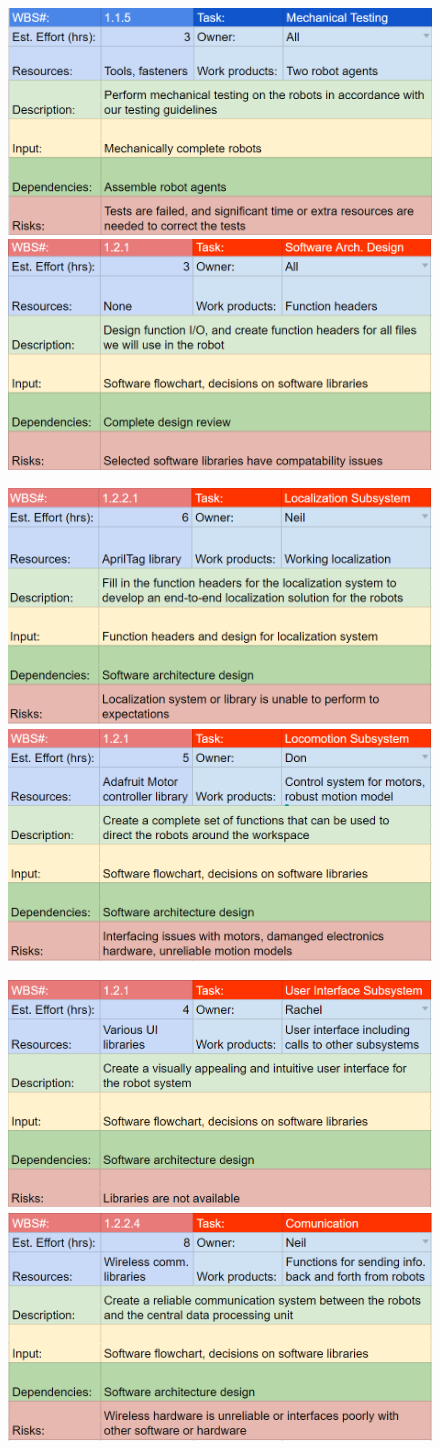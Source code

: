 \begin{figure}[h!]
\centering
\includegraphics[width=0.49\columnwidth]{wbs_schedule/wbs_dict_hw7.png}
\includegraphics[width=0.49\columnwidth]{wbs_schedule/wbs_dict_sw1.png}
\label{fig:hw7sw1}
\end{figure}
\begin{figure}[h!]
\centering
\includegraphics[width=0.49\columnwidth]{wbs_schedule/wbs_dict_sw2.png}
\includegraphics[width=0.49\columnwidth]{wbs_schedule/wbs_dict_sw3.png}
\label{fig:sw2sw3}
\end{figure}
\begin{figure}[h!]
\centering
\includegraphics[width=0.49\columnwidth]{wbs_schedule/wbs_dict_sw4.png}
\includegraphics[width=0.49\columnwidth]{wbs_schedule/wbs_dict_sw5.png}
\label{fig:sw4sw5}
\end{figure}
